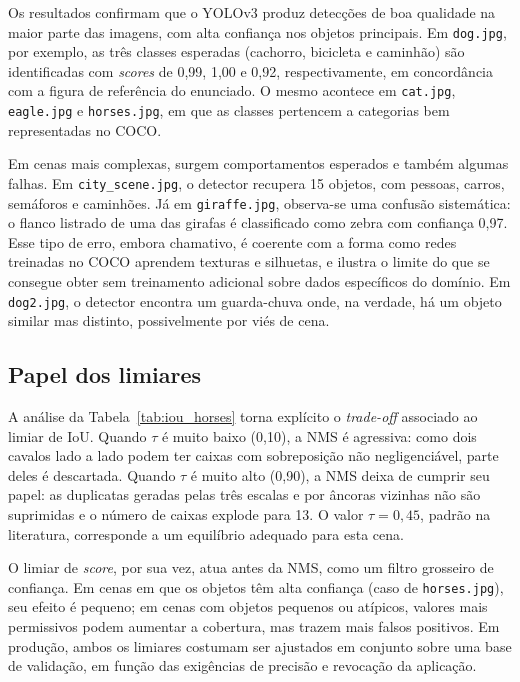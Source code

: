 \documentclass[11pt,a4paper]{article}
\begin{document}
Os resultados confirmam que o YOLOv3 produz detecções de boa qualidade na maior parte das imagens, com alta confiança nos objetos principais. Em \texttt{dog.jpg}, por exemplo, as três classes esperadas (cachorro, bicicleta e caminhão) são identificadas com \emph{scores} de 0{,}99, 1{,}00 e 0{,}92, respectivamente, em concordância com a figura de referência do enunciado. O mesmo acontece em \texttt{cat.jpg}, \texttt{eagle.jpg} e \texttt{horses.jpg}, em que as classes pertencem a categorias bem representadas no COCO.

Em cenas mais complexas, surgem comportamentos esperados e também algumas falhas. Em \texttt{city\_scene.jpg}, o detector recupera 15 objetos, com pessoas, carros, semáforos e caminhões. Já em \texttt{giraffe.jpg}, observa-se uma confusão sistemática: o flanco listrado de uma das girafas é classificado como zebra com confiança 0{,}97. Esse tipo de erro, embora chamativo, é coerente com a forma como redes treinadas no COCO aprendem texturas e silhuetas, e ilustra o limite do que se consegue obter sem treinamento adicional sobre dados específicos do domínio. Em \texttt{dog2.jpg}, o detector encontra um guarda-chuva onde, na verdade, há um objeto similar mas distinto, possivelmente por viés de cena.

\subsection{Papel dos limiares}

A análise da Tabela~\ref{tab:iou_horses} torna explícito o \emph{trade-off} associado ao limiar de IoU. Quando $\tau$ é muito baixo (0{,}10), a NMS é agressiva: como dois cavalos lado a lado podem ter caixas com sobreposição não negligenciável, parte deles é descartada. Quando $\tau$ é muito alto (0{,}90), a NMS deixa de cumprir seu papel: as duplicatas geradas pelas três escalas e por âncoras vizinhas não são suprimidas e o número de caixas explode para 13. O valor $\tau = 0{,}45$, padrão na literatura, corresponde a um equilíbrio adequado para esta cena.

O limiar de \emph{score}, por sua vez, atua antes da NMS, como um filtro grosseiro de confiança. Em cenas em que os objetos têm alta confiança (caso de \texttt{horses.jpg}), seu efeito é pequeno; em cenas com objetos pequenos ou atípicos, valores mais permissivos podem aumentar a cobertura, mas trazem mais falsos positivos. Em produção, ambos os limiares costumam ser ajustados em conjunto sobre uma base de validação, em função das exigências de precisão e revocação da aplicação.
\end{document}
